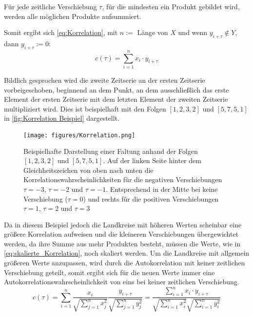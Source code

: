 Für jede zeitliche Verschiebung $\tau$, für die mindesten ein Produkt gebildet wird, werden alle möglichen Produkte aufsummiert.

Somit ergibt sich \autoref{eq:Korrelation}, mit $n := $ Länge von $X$ und wenn $y_{i+\tau} \not\in Y$, dann $y_{i+\tau} := 0$:
\begin{equation}\label{eq:Korrelation}
    c(\tau) = \sum_{i=1}^n x_i\cdot y_{i+\tau}
\end{equation}


Bildlich gesprochen wird die zweite Zeitserie an der ersten Zeitserie vorbeigeschoben, beginnend an dem Punkt, an dem ausschließlich das erste Element der ersten Zeitserie mit dem letzten Element der zweiten Zeitserie multipliziert wird. Dies ist beispielhaft mit den Folgen $[1,2,3,2]$ und $[5,7,5,1]$ in \autoref{fig:Korrelation Beispiel} dargestellt.

\begin{figure}[H]
    \centering
    \texttt{[image: figures/Korrelation.png]}
    \caption{Beispielhafte Darstellung einer Faltung anhand der Folgen $[1,2,3,2]$ und $[5,7,5,1]$. Auf der linken Seite hinter dem Gleichheitszeichen von oben nach unten die Korrelationswahrscheinlichkeiten für die negativen Verschiebungen $\tau=-3$, $\tau=-2$ und $\tau=-1$. Entsprechend in der Mitte bei keine Verschiebung ($\tau=0$) und rechts für die positiven Verschiebungen $\tau=1$, $\tau=2$ und $\tau=3$}
    \label{fig:Korrelation Beispiel}
\end{figure}

Da in diesem Beispiel jedoch die Landkreise mit höheren Werten scheinbar eine größere Korrelation aufweisen und die kleineren Verschiebungen übergewichtet werden, da ihre Summe aus mehr Produkten besteht, müssen die Werte, wie in \autoref{eq:skalierte_Korrelation}, noch skaliert werden.
Um die Landkreise mit allgemein größeren Werte anzupassen, wird durch die Autokorrelation mit keiner zeitlichen Verschiebung
geteilt, somit ergibt sich für die neuen Werte immer eine Autokorrelationswahrscheinlichkeit von eins bei keiner zeitlichen Verschiebung.
\begin{equation}\label{eq:skalierte_Korrelation}
    c(\tau) =\sum_{i=1}^n \frac{x_i}{\sqrt{\sum_{j=1}^n x_j^2}}
    \frac{y_{i+\tau}}{\sqrt{\sum_{j=1}^n y_j^2}}= 
    \frac{\sum_{i=1}^n x_i\cdot y_{i+\tau}}{\sqrt{\sum_{i=1}^n x_i^2}\sqrt{\sum_{i=1}^n y_i^2}}
\end{equation}

